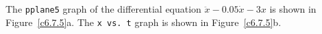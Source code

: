 The {\tt pplane5} graph of the differential equation
$\ddot{x} - 0.05\dot{x} - 3x$ is shown in Figure~\ref{c6.7.5}a.  The
{\tt x vs.\ t} graph is shown in Figure~\ref{c6.7.5}b.

\begin{figure}[htb]
                       \centerline{%
                       }
\end{figure}





















